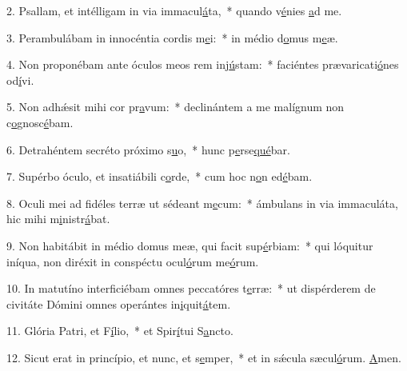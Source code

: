 2. Psallam, et intélligam in via immacul\uline{á}ta,~* quando v\uline{é}nies \uline{a}d me.\par 
3. Perambulábam in innocéntia cordis m\uline{e}i:~* in médio d\uline{o}mus m\uline{e}æ.\par 
4. Non proponébam ante óculos meos rem inj\uline{ú}stam:~* faciéntes prævaricati\uline{ó}nes od\uline{í}vi.\par 
5. Non adhǽsit mihi cor pr\uline{a}vum:~* declinántem a me malígnum non c\uline{o}gnosc\uline{é}bam.\par 
6. Detrahéntem secréto próximo s\uline{u}o,~* hunc p\uline{e}rse\uline{qué}bar.\par 
7. Supérbo óculo, et insatiábili c\uline{o}rde,~* cum hoc n\uline{o}n ed\uline{é}bam.\par 
8. Oculi mei ad fidéles terræ ut sédeant m\uline{e}cum:~* ámbulans in via immaculáta, hic mihi m\uline{i}nistr\uline{á}bat.\par 
9. Non habitábit in médio domus meæ, qui facit sup\uline{é}rbiam:~* qui lóquitur iníqua, non diréxit in conspéctu ocul\uline{ó}rum me\uline{ó}rum.\par 
10. In matutíno interficiébam omnes peccatóres t\uline{e}rræ:~* ut dispérderem de civitáte Dómini omnes operántes in\uline{i}quit\uline{á}tem.\par 
11. Glória Patri, et F\uline{í}lio,~* et Spir\uline{í}tui S\uline{a}ncto.\par 
12. Sicut erat in princípio, et nunc, et s\uline{e}mper,~* et in sǽcula sæcul\uline{ó}rum. \uline{A}men.\par 
